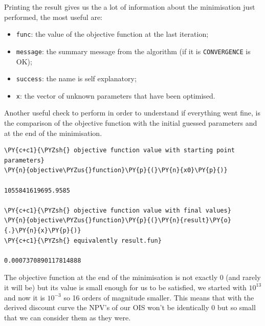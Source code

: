 Printing the result gives us the a lot of information about the minimisation just performed, the most useful are:
\begin{itemize}
\item \texttt{func}: the value of the objective function at the last iteration;
\item \texttt{message}: the summary message from the algorithm (if it is \texttt{CONVERGENCE} is OK);
\item \texttt{success}: the name is self explanatory;
\item \texttt{x}: the vector of unknown parameters that have been optimised.
\end{itemize}

Another useful check to perform in order to understand if everything went fine, is the comparison of the objective function with the initial guessed parameters and at the end of the minimisation.

\begin{tcolorbox}[breakable, size=fbox, boxrule=1pt, pad at break*=1mm,colback=cellbackground, colframe=cellborder]
\begin{Verbatim}[commandchars=\\\{\}]
\PY{c+c1}{\PYZsh{} objective function value with starting point parameters}
\PY{n}{objective\PYZus{}function}\PY{p}{(}\PY{n}{x0}\PY{p}{)} 

1055841619695.9585

\PY{c+c1}{\PYZsh{} objective function value with final values}
\PY{n}{objective\PYZus{}function}\PY{p}{(}\PY{n}{result}\PY{o}{.}\PY{n}{x}\PY{p}{)} 
\PY{c+c1}{\PYZsh{} equivalently result.fun}

0.0007370890117814888
\end{Verbatim}
\end{tcolorbox}

The objective function at the end of the minimisation is not exactly 0 (and rarely it will be) but its value is small enough for us to be satisfied, we started with $10^{13}$ and now it is $10^{-3}$ so 16 orders of magnitude smaller. This means that with the derived discount curve the NPV's of our OIS won't be identically 0 but so small that we can consider them as they were.

